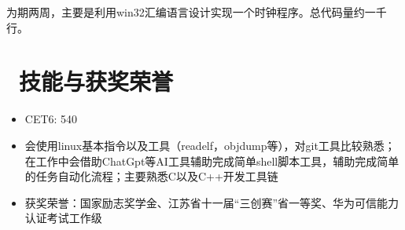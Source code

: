 \documentclass{resume}
\begin{document}
为期两周，主要是利用win32汇编语言设计实现一个时钟程序。总代码量约一千行。

\section{\faInfo\ 技能与获奖荣誉}
\begin{itemize}[parsep=0.5ex]
  \item CET6: 540
  \item 会使用linux基本指令以及工具（readelf，objdump等），对git工具比较熟悉；在工作中会借助ChatGpt等AI工具辅助完成简单shell脚本工具，辅助完成简单的任务自动化流程；主要熟悉C以及C++开发工具链
  \item 获奖荣誉：国家励志奖学金、江苏省十一届“三创赛”省一等奖、华为可信能力认证考试工作级
\end{itemize}

%
%
\end{document}
